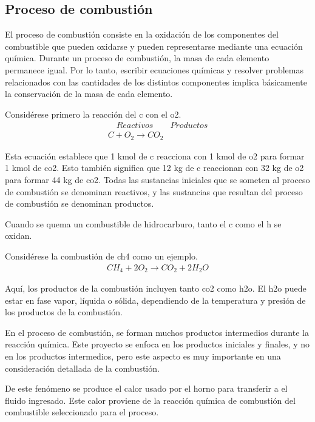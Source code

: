 \subsection{Proceso de combustión}
\par El proceso de combustión consiste en la oxidación de los componentes del combustible que pueden oxidarse y pueden representarse mediante una ecuación química. Durante un proceso de combustión, la masa de cada elemento permanece igual. Por lo tanto, escribir ecuaciones químicas y resolver problemas relacionados con las cantidades de los distintos componentes implica básicamente la conservación de la masa de cada elemento.
\par Considérese primero la reacción del \ac{c} con el \ac{o2}.
\begin{equation}
\label{eq:co2}
    \begin{gathered}
    \quad Reactivos \quad \quad Productos\\
    C + O_2 \rightarrow CO_2
    \end{gathered}
\end{equation}
\par Esta ecuación establece que 1 kmol de \ac{c} reacciona con 1 kmol de \ac{o2} para formar 1 kmol de \ac{co2}. Esto también significa que 12 kg de \ac{c} reaccionan con 32 kg de \ac{o2} para formar 44 kg de \ac{co2}. Todas las sustancias iniciales que se someten al proceso de combustión se denominan reactivos, y las sustancias que resultan del proceso de combustión se denominan productos.
\par Cuando se quema un combustible de hidrocarburo, tanto el \ac{c} como el \ac{h} se oxidan.
\par Considérese la combustión de \ac{ch4} como un ejemplo.
\begin{equation*}
    \begin{gathered}
    CH_4 + 2O_2 \rightarrow CO_2 + 2H_2O
    \end{gathered}
\end{equation*}
\par Aquí, los productos de la combustión incluyen tanto \ac{co2} como \ac{h2o}. El \ac{h2o} puede estar en fase vapor, líquida o sólida, dependiendo de la temperatura y presión de los productos de la combustión.
\par En el proceso de combustión, se forman muchos productos intermedios durante la reacción química. Este proyecto se enfoca en los productos iniciales y finales, y no en los productos intermedios, pero este aspecto es muy importante en una consideración detallada de la combustión.
\par De este fenómeno se produce el calor usado por el horno para transferir a el fluido ingresado. Este calor proviene de la reacción química de combustión del combustible seleccionado para el proceso.

